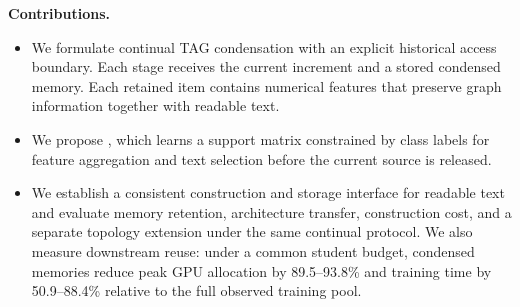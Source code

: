 \noindent\textbf{Contributions.}
\begin{itemize}[leftmargin=*,nosep]
\item We formulate continual TAG condensation with an explicit historical
access boundary. Each stage receives the current increment and a stored
condensed memory. Each retained item contains numerical features that
preserve graph information together with readable text.
\item We propose \method{}, which learns a support matrix constrained by
class labels for feature aggregation and text selection
before the current source is released.
\item We establish a consistent construction and storage interface for readable
text and evaluate memory retention, architecture transfer, construction cost,
and a separate topology extension under the same continual protocol. We also
measure downstream reuse: under a common student budget, condensed memories
reduce peak GPU allocation by 89.5--93.8\% and training time by 50.9--88.4\%
relative to the full observed training pool.
\end{itemize}
